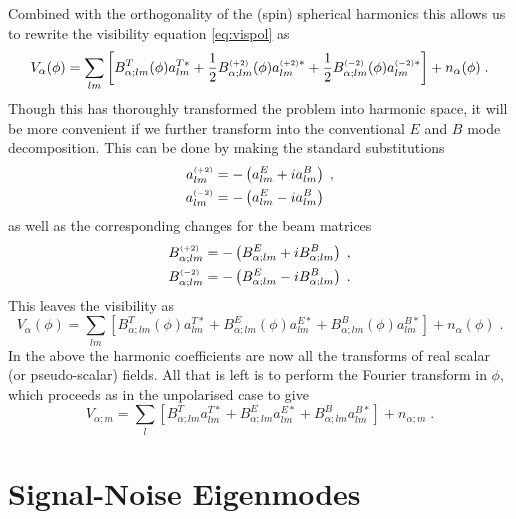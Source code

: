 \documentclass[onecolumn]{revtex4}
\begin{document}
Combined with the orthogonality of the (spin) spherical harmonics this
allows us to rewrite the visibility equation \eqref{eq:vispol} as
\begin{equation}
V_{\alpha}(\phi) = \sum_{lm} \left[B_{\alpha;lm}^T(\phi) a^{T*}_{lm} +
\frac{1}{2} B_{\alpha;lm}^{\scriptscriptstyle \left(+2\right)}(\phi) a^{{\scriptscriptstyle \left(+2\right)}*}_{lm} +
\frac{1}{2} B_{\alpha;lm}^{\scriptscriptstyle \left(-2\right)}(\phi) a^{{\scriptscriptstyle \left(-2\right)}*}_{lm}\right] + n_{\alpha}(\phi)
\; .
\end{equation}
Though this has thoroughly transformed the problem into harmonic
space, it will be more convenient if we further transform into the
conventional $E$ and $B$ mode decomposition. This can be done by
making the standard substitutions
\begin{align}
a^{\scriptscriptstyle \left(+2\right)}_{lm} & = -\left(a^E_{lm} + i a^B_{lm}\right) \; ,\\
a^{\scriptscriptstyle \left(-2\right)}_{lm} & = -\left(a^E_{lm} - i a^B_{lm}\right)
\end{align}
as well as the corresponding changes for the beam matrices
\begin{align}
  B^{\scriptscriptstyle \left(+2\right)}_{\alpha;lm} & = -\left(B^E_{\alpha;lm} + i B^B_{\alpha;lm}\right) \; ,\\
  B^{\scriptscriptstyle \left(-2\right)}_{\alpha;lm} & = -\left(B^E_{\alpha;lm} - i B^B_{\alpha;lm}\right)
  \; .
\end{align}
This leaves the visibility as
\begin{equation}
V_{\alpha}(\phi) = \sum_{lm} \left[B_{\alpha;lm}^T(\phi) a^{T*}_{lm} +
B_{\alpha;lm}^E(\phi) a^{E*}_{lm} + B_{\alpha;lm}^B(\phi)
a^{B*}_{lm}\right] + n_{\alpha}(\phi)
\; .
\end{equation}
In the above the harmonic coefficients are now all the transforms of real scalar
(or pseudo-scalar) fields. All that is left is to perform the Fourier transform
in $\phi$, which proceeds as in the unpolarised case to give
\begin{equation}
V_{\alpha; m} = \sum_{l} \left[B_{\alpha;lm}^T a^{T*}_{lm} +
B_{\alpha;lm}^E a^{E*}_{lm} + B_{\alpha;lm}^B
a^{B*}_{lm}\right] + n_{\alpha; m}
\; .
\end{equation}


\section{Signal-Noise Eigenmodes}

\end{document}
